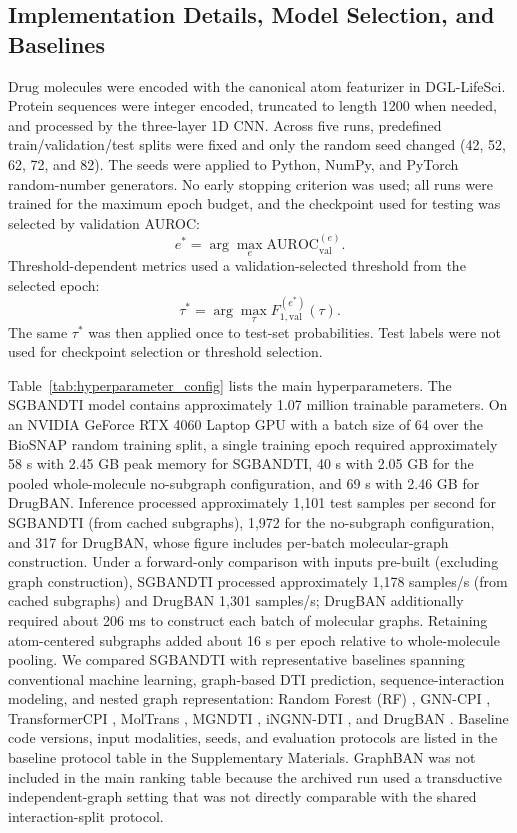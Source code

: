 \documentclass[computers,article,submit,moreauthors]{Definitions/mdpi}
\begin{document}
\subsection{Implementation Details, Model Selection, and Baselines}
Drug molecules were encoded with the canonical atom featurizer in DGL-LifeSci. Protein sequences were integer encoded, truncated to length 1200 when needed, and processed by the three-layer 1D CNN. Across five runs, predefined train/validation/test splits were fixed and only the random seed changed (42, 52, 62, 72, and 82). The seeds were applied to Python, NumPy, and PyTorch random-number generators. No early stopping criterion was used; all runs were trained for the maximum epoch budget, and the checkpoint used for testing was selected by validation AUROC:
\begin{equation}
e^* = \arg\max_e \mathrm{AUROC}_{\mathrm{val}}^{(e)}.
\end{equation}
Threshold-dependent metrics used a validation-selected threshold from the selected epoch:
\begin{equation}
\tau^* = \arg\max_\tau F_{1,\mathrm{val}}^{(e^*)}(\tau).
\end{equation}
The same $\tau^*$ was then applied once to test-set probabilities. Test labels were not used for checkpoint selection or threshold selection.

Table~\ref{tab:hyperparameter_config} lists the main hyperparameters. The SGBANDTI model contains approximately 1.07 million trainable parameters. On an NVIDIA GeForce RTX 4060 Laptop GPU with a batch size of 64 over the BioSNAP random training split, a single training epoch required approximately 58 s with 2.45 GB peak memory for SGBANDTI, 40 s with 2.05 GB for the pooled whole-molecule no-subgraph configuration, and 69 s with 2.46 GB for DrugBAN. Inference processed approximately 1,101 test samples per second for SGBANDTI (from cached subgraphs), 1,972 for the no-subgraph configuration, and 317 for DrugBAN, whose figure includes per-batch molecular-graph construction. Under a forward-only comparison with inputs pre-built (excluding graph construction), SGBANDTI processed approximately 1,178 samples/s (from cached subgraphs) and DrugBAN 1,301 samples/s; DrugBAN additionally required about 206 ms to construct each batch of molecular graphs. Retaining atom-centered subgraphs added about 16 s per epoch relative to whole-molecule pooling. We compared SGBANDTI with representative baselines spanning conventional machine learning, graph-based DTI prediction, sequence-interaction modeling, and nested graph representation: Random Forest (RF) \citep{breiman2001}, GNN-CPI \citep{tsubaki2019}, TransformerCPI \citep{chen2020}, MolTrans \citep{huang2021moltrans}, MGNDTI \citep{peng2024}, iNGNN-DTI \citep{sun2024ingnndti}, and DrugBAN \citep{bai2023drugban}. Baseline code versions, input modalities, seeds, and evaluation protocols are listed in the baseline protocol table in the Supplementary Materials. GraphBAN was not included in the main ranking table because the archived run used a transductive independent-graph setting that was not directly comparable with the shared interaction-split protocol.
\end{document}
